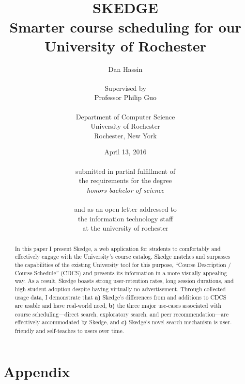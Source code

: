 \documentclass[titlepage]{report}
\title{
\vspace{50pt}\\
\huge \bfseries SKEDGE
\\
\vspace{10pt}
\Large
Smarter course scheduling for our\\
University of Rochester
}
\author{
	Dan Hassin\\
    \vspace{5pt}\\
    Supervised by\\
    Professor Philip Guo\\
    \vspace{2pt}\\
    Department of Computer Science\\
    University of Rochester\\
    Rochester, New York\\
}
\date{April 13, 2016\\
    \vspace{100pt}\\
    submitted in partial fulfillment of\\
    the requirements for the degree\\
    \emph{honors bachelor of science}\\
    \vspace{30pt}\\
    and as an open letter addressed to\\
    the information technology staff\\
    at the university of rochester
    \vspace{-30pt}
}
\begin{document}
\maketitle


\onehalfspacing

\setcounter{tocdepth}{1}
\tableofcontents

\listoffigures

\clearpage


\doublespacing


\begin{abstract}

\thispagestyle{plain}

In this paper I present Skedge, a web application for students to comfortably and effectively engage with the University's course catalog. Skedge matches and surpasses the capabilities of the existing University tool for this purpose, ``Course Description / Course Schedule'' (CDCS) and presents its information in a more visually appealing way. As a result, Skedge boasts strong user-retention rates, long session durations, and high student adoption despite having virtually no advertisement. Through collected usage data, I demonstrate that \textbf{a)} Skedge's differences from and additions to CDCS are usable and have real-world need, \textbf{b)} the three major use-cases associated with course scheduling---direct search, exploratory search, and peer recommendation---are effectively accommodated by Skedge, and \textbf{c)} Skedge's novel search mechanism is user-friendly and self-teaches to users over time.

\end{abstract}




\setlength{\skip\footins}{0.75cm}



\clearpage


\clearpage


\clearpage


\clearpage


\clearpage


\singlespacing





\clearpage
\section*{Appendix}
\end{document}
